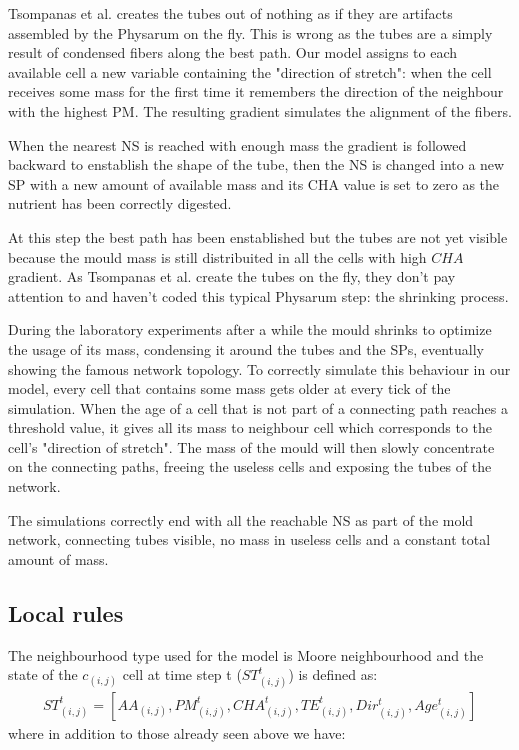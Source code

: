\par
Tsompanas et al. \cite{Tsompanas2016} creates the tubes out of nothing as if they are artifacts assembled by the Physarum on the fly. This is wrong as the tubes are a simply result of condensed fibers along the best path. Our model assigns to each available cell a new variable containing the "direction of stretch": when the cell receives some mass for the first time it remembers the direction of the neighbour with the highest PM. The resulting gradient simulates the alignment of the fibers.

\par
When the nearest NS is reached with enough mass the gradient is followed backward to enstablish the shape of the tube, then the NS is changed into a new SP with a new amount of available mass and its CHA value is set to zero as the nutrient has been correctly digested.

\par
At this step the best path has been enstablished but the tubes are not yet visible because the mould mass is still distribuited in all the cells with high $CHA$ gradient.
As Tsompanas et al. \cite{Tsompanas2016} create the tubes on the fly, they don't pay attention to and haven't coded this typical Physarum step: the shrinking process.

\par
During the laboratory experiments after a while the mould shrinks to optimize the usage of its mass, condensing it around the tubes and the SPs, eventually showing the famous network topology.
To correctly simulate this behaviour in our model, every cell that contains some mass gets older at every tick of the simulation. When the age of a cell that is not part of a connecting path reaches a threshold value, it gives all its mass to neighbour cell which corresponds to the cell's "direction of stretch". The mass of the mould will then slowly concentrate on the connecting paths, freeing the useless cells and exposing the tubes of the network.

\par
The simulations correctly end with all the reachable NS as part of the mold network, connecting tubes visible, no mass in useless cells and a constant total amount of mass.

\subsection{Local rules}

The neighbourhood type used for the model is Moore neighbourhood and the state of the $c_{(i, j)}$ cell at time step t ($ ST^t_{(i, j)}$) is defined as:
\begin{align}
ST^t_{(i, j)} = [AA_{(i, j)}, PM^t_{(i, j)}, CHA^t_{(i, j)}, TE^t_{(i, j)}, Dir^t_{(i, j)}, Age^t_{(i, j)}]
\end{align}
where in addition to those already seen above we have:

